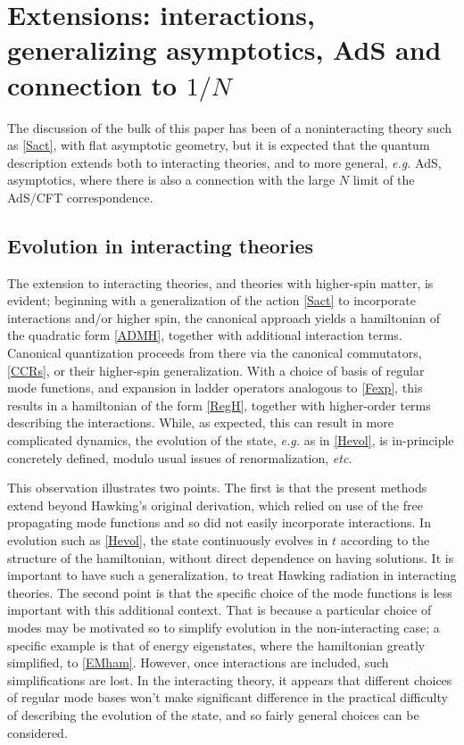 \documentclass[12pt]{article}
\numberwithin{equation}{section}
\begin{document}
\section{Extensions: interactions, generalizing asymptotics, AdS and connection to $1/N$}

The discussion of the bulk of this paper has been of a noninteracting theory such as \eqref{Sact}, with flat asymptotic geometry, but it is expected that the quantum description extends both to interacting theories, and to more general, {\it e.g.} AdS, asymptotics, where there is also a connection with the large $N$ limit of the AdS/CFT correspondence.

\subsection{Evolution in interacting theories}

The extension to interacting theories, and theories with higher-spin matter, is evident; beginning with a generalization of the action \eqref{Sact} to incorporate interactions and/or higher spin, 
 the canonical approach yields a hamiltonian of the quadratic  form \eqref{ADMH}, together with additional interaction terms.  Canonical quantization proceeds from there via the canonical commutators, \eqref{CCRs}, or their higher-spin generalization.  With a choice of basis of regular mode functions, and expansion in ladder operators analogous to \eqref{Fexp}, this results in a hamiltonian of the form \eqref{RegH}, together with higher-order terms describing the interactions.  While, as expected, this can result in more complicated dynamics, the evolution of the state, {\it e.g.} as in \eqref{Hevol}, is in-principle concretely defined, modulo usual issues of renormalization, {\it etc.} 

This observation illustrates two points.  The first is that the present methods extend beyond Hawking's original derivation\cite{Hawk}, which relied on use of the free propagating mode functions and so did not easily incorporate interactions.  In evolution such as \eqref{Hevol}, the state continuously evolves in $t$ according to the structure of the hamiltonian, without direct dependence on having solutions.  It is important to have such a generalization, to treat Hawking radiation in interacting theories.  The second point is that the specific choice of the mode functions is less important with this additional context.  That is because a particular choice of modes may be motivated so to simplify evolution in the non-interacting case; a specific example is that of energy eigenstates, where the hamiltonian greatly simplified, to \eqref{EMham}.  However, once interactions are included, such simplifications are lost.  In the interacting theory, it appears that different choices of regular mode bases won't make significant difference in the practical difficulty of describing the evolution of the state, and so fairly general choices can be considered.
\end{document}
